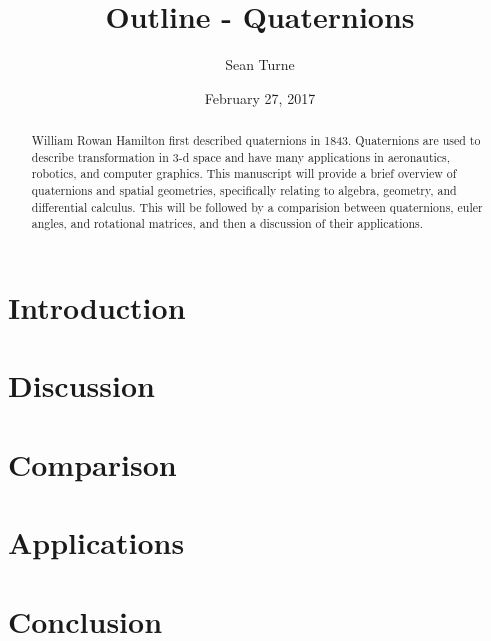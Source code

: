\documentclass{article}
\begin{document}
\nocite{*}
\title{Outline - Quaternions}
\date{February 27, 2017}
\author{Sean Turne}

\maketitle

\begin{abstract}
\noindent William Rowan Hamilton first described quaternions in 1843.
Quaternions are used to describe transformation in 3-d space and have many applications in aeronautics, robotics, and computer graphics.
This manuscript will provide a brief overview of quaternions and spatial geometries, specifically relating to algebra, geometry, and differential calculus.
This will be followed by a comparision between quaternions, euler angles, and rotational matrices, and then a discussion of their applications.
\end{abstract}

\section{Introduction}


\section{Discussion}


\section{Comparison}


\section{Applications}


\section{Conclusion}


\newpage


\end{document}
